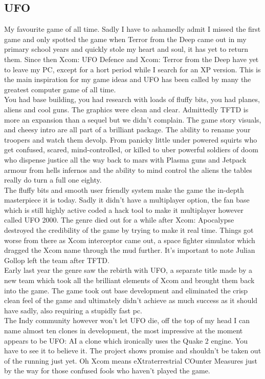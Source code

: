 \documentclass[a4paper]{article}
\begin{document}
\subsection{UFO}
My favourite game of all time. Sadly I have to ashamedly admit I missed the first game and only spotted the game when Terror from the Deep came out in my primary school years and quickly stole my heart and soul, it has yet to return them. Since then Xcom: UFO Defence and Xcom: Terror from the Deep have yet to leave my PC, except for a hort period while I search for an XP version. This is the main inspiration for my game ideas and UFO has been called by many the greatest computer game of all time.\\
You had base building, you had research with loads of fluffy bits, you had planes, aliens and cool guns. The graphics were clean and clear. Admittedly TFTD is more an expansion than a sequel but we didn't complain. The game story visuals, and cheesy intro are all part of a brilliant package. The ability to rename your troopers and watch them devolp. From panicky little under powered squirts who get confused, scared, mind-controlled, or killed to uber powerful soldiers of doom who dispense justice all the way back to mars with Plasma guns and Jetpack armour from hells infernos and the ability to mind control the aliens the tables really do turn a full one eighty.\\
The fluffy bits and smooth user friendly system make the game the in-depth masterpiece it is today. Sadly it didn't have a multiplayer option, the fan base which is still highly active coded a hack tool to make it multiplayer however called UFO 2000. The genre died out for a while after Xcom: Apocalypse destroyed the credibility of the game by trying to make it real time. Things got worse from there as Xcom interceptor came out, a space fighter simulator which dragged the Xcom name through the mud further. It's important to note Julian Gollop left the team after TFTD.\\
Early last year the genre saw the rebirth with UFO, a separate title made by a new team which took all the brilliant elements of Xcom and brought them back into the game. The game took out base development and eliminated the crisp clean feel of the game and ultimately didn't achieve as much success as it should have sadly, also requiring a stupidly fast pc.\\
The Indy community however won't let UFO die, off the top of my head I can name almost ten clones in development, the most impressive at the moment appears to be UFO: AI a clone which ironically uses the Quake 2 engine. You have to see it to believe it. The project shows promise and shouldn't be taken out of the running just yet. Oh Xcom means eXtraterrestrial COunter Measures just by the way for those confused fools who haven't played the game.
\end{document}
